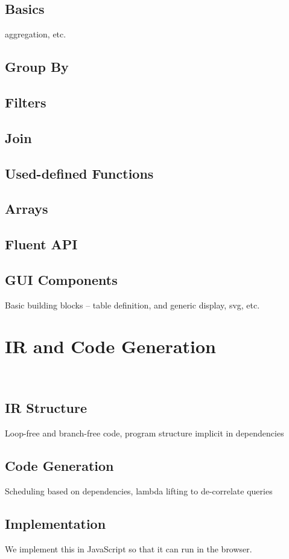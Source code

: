 \documentclass[runningheads]{llncs}
\begin{document}
\subsection{Basics}
aggregation, etc.

\subsection{Group By}
\subsection{Filters}
\subsection{Join}
\subsection{Used-defined Functions}
\subsection{Arrays}
\subsection{Fluent API}

\subsection{GUI Components}
Basic building blocks -- table definition, and generic display, svg, etc. 

\section{IR and Code Generation}~\label{sec:ir_codegen}
\subsection{IR Structure}
Loop-free and branch-free code, program structure implicit in dependencies

\subsection{Code Generation}
Scheduling based on dependencies, lambda lifting to de-correlate queries

\subsection{Implementation}
We implement this in JavaScript so that it can run in the browser.
\end{document}
